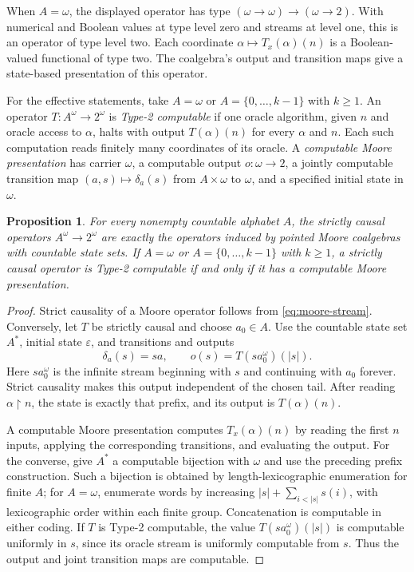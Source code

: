 \documentclass[11pt]{article}
\newtheorem{proposition}[theorem]{Proposition}
\theoremstyle{definition}
\begin{document}
When $A=\omega$, the displayed operator has type
$(\omega\to\omega)\to(\omega\to2)$. With numerical and Boolean
values at type level zero and streams at level one, this is an operator
of type level two. Each coordinate $\alpha\mapsto T_x(\alpha)(n)$
is a Boolean-valued functional of type two. The coalgebra's output and
transition maps give a state-based presentation of this operator.

For the effective statements, take $A=\omega$ or
$A=\{0,\ldots,k-1\}$ with $k\geq1$. An operator
$T:A^\omega\to2^\omega$ is \emph{Type-2 computable} if one oracle
algorithm, given $n$ and oracle access to $\alpha$, halts with output
$T(\alpha)(n)$ for every $\alpha$ and $n$. Each such computation
reads finitely many coordinates of its oracle. A \emph{computable
Moore presentation} has carrier $\omega$, a computable output
$o:\omega\to2$, a jointly computable transition map
$(a,s)\mapsto\delta_a(s)$ from $A\times\omega$ to $\omega$,
and a specified initial state in $\omega$.

\begin{proposition}\label{prop:moore-realization}
For every nonempty countable alphabet $A$, the strictly causal
operators $A^\omega\to2^\omega$ are exactly the operators induced
by pointed Moore coalgebras with countable state sets. If $A=\omega$
or $A=\{0,\ldots,k-1\}$ with $k\geq1$, a strictly causal operator
is Type-2 computable if and only if it has a computable Moore
presentation.
\end{proposition}
\begin{proof}
Strict causality of a Moore operator follows from
\eqref{eq:moore-stream}. Conversely, let $T$ be strictly causal
and choose $a_0\in A$. Use the countable state set $A^*$, initial
state $\varepsilon$, and transitions and outputs
\[
 \delta_a(s)=sa,\qquad o(s)=T(sa_0^\omega)(|s|).
\]
Here $sa_0^\omega$ is the infinite stream beginning with $s$ and
continuing with $a_0$ forever. Strict causality makes this output
independent of the chosen tail. After reading
$\alpha\upharpoonright n$, the state is exactly that prefix, and
its output is $T(\alpha)(n)$.

A computable Moore presentation computes $T_x(\alpha)(n)$ by
reading the first $n$ inputs, applying the corresponding transitions,
and evaluating the output. For the converse, give $A^*$ a computable
bijection with $\omega$ and use the preceding prefix construction.
Such a bijection is obtained by length-lexicographic enumeration for
finite $A$; for $A=\omega$, enumerate words by increasing
$|s|+\sum_{i<|s|}s(i)$, with lexicographic order within each finite
group. Concatenation is computable in either coding. If $T$ is
Type-2 computable, the value $T(sa_0^\omega)(|s|)$ is computable
uniformly in $s$, since its oracle stream is uniformly computable
from $s$. Thus the output and joint transition maps are computable.
\end{proof}
\end{document}
